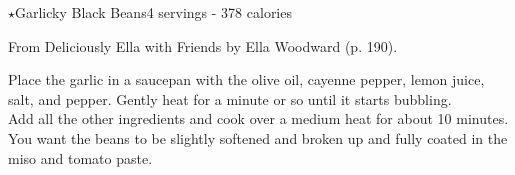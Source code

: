 \begin{recipe}{$\star$Garlicky Black Beans}{4 servings - 378 calories}{}

\freeform From {\normalfont Deliciously Ella with Friends} by Ella Woodward (p. 190).


Place the garlic in a saucepan with the olive oil, cayenne pepper, lemon juice, salt, and pepper. Gently heat for a minute or so until it starts bubbling.\\

Add all the other ingredients and cook over a medium heat for about 10 minutes. You want the beans to be slightly softened and broken up and fully coated in the miso and tomato paste.

\end{recipe}